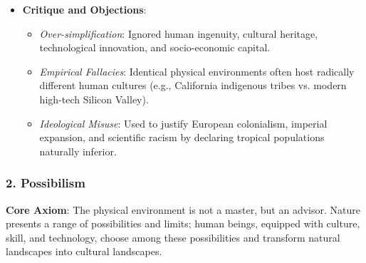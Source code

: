 \documentclass[11pt,a4paper]{article}
\begin{document}
\begin{itemize}[leftmargin=*]
  \item \textbf{Critique and Objections}:
  \begin{itemize}
    \item \textit{Over-simplification}: Ignored human ingenuity, cultural heritage, technological innovation, and socio-economic capital.
    \item \textit{Empirical Fallacies}: Identical physical environments often host radically different human cultures (e.g., California indigenous tribes vs. modern high-tech Silicon Valley).
    \item \textit{Ideological Misuse}: Used to justify European colonialism, imperial expansion, and scientific racism by declaring tropical populations naturally inferior.
  \end{itemize}
\end{itemize}

\subsubsection{2. Possibilism}
\begin{keybox}[Possibilism]
\textbf{Core Axiom}: The physical environment is not a master, but an advisor. Nature presents a range of possibilities and limits; human beings, equipped with culture, skill, and technology, choose among these possibilities and transform natural landscapes into cultural landscapes.
\end{keybox}
\end{document}
